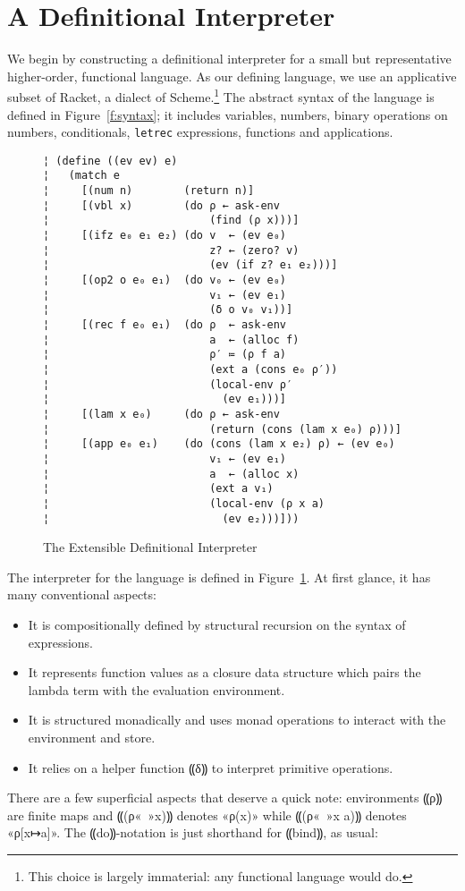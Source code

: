 \section{A Definitional Interpreter}\label{s:interp}

We begin by constructing a definitional interpreter for a small but
representative higher-order, functional language.  As our defining language, we
use an applicative subset of Racket, a dialect of Scheme.\footnote{This choice
  is largely immaterial: any functional language would do.} The abstract syntax
of the language is defined in Figure~\ref{f:syntax}; it includes variables,
numbers, binary operations on numbers, conditionals, {\tt letrec} expressions,
functions and applications.

\begin{figure} %
\begin{lstlisting}
¦ (define ((ev ev) e)
¦   (match e
¦     [(num n)        (return n)]
¦     [(vbl x)        (do ρ ← ask-env
¦                         (find (ρ x)))]    
¦     [(ifz e₀ e₁ e₂) (do v  ← (ev e₀)
¦                         z? ← (zero? v)
¦                         (ev (if z? e₁ e₂)))]
¦     [(op2 o e₀ e₁)  (do v₀ ← (ev e₀)
¦                         v₁ ← (ev e₁)
¦                         (δ o v₀ v₁))]
¦     [(rec f e₀ e₁)  (do ρ  ← ask-env
¦                         a  ← (alloc f)
¦                         ρ′ ≔ (ρ f a)
¦                         (ext a (cons e₀ ρ′))
¦                         (local-env ρ′
¦                           (ev e₁)))]
¦     [(lam x e₀)     (do ρ ← ask-env
¦                         (return (cons (lam x e₀) ρ)))]
¦     [(app e₀ e₁)    (do (cons (lam x e₂) ρ) ← (ev e₀)
¦                         v₁ ← (ev e₁)
¦                         a  ← (alloc x)         
¦                         (ext a v₁)
¦                         (local-env (ρ x a) 
¦                           (ev e₂)))]))
\end{lstlisting}
\caption{The Extensible Definitional Interpreter}
\label{f:interpreter}
\end{figure} %

The interpreter for the language is defined in Figure~\ref{f:interpreter}. At
first glance, it has many conventional aspects:
\begin{itemize}
\item It is compositionally defined by structural recursion on the syntax of
expressions.
\item It represents function values as a closure data structure which pairs the
lambda term with the evaluation environment.
\item It is structured monadically and uses monad operations to interact with
the environment and store.
\item It relies on a helper function ⸨δ⸩ to interpret primitive operations.
\end{itemize}
There are a few superficial aspects that deserve a quick note:
environments ⸨ρ⸩ are finite maps and ⸨(ρ«\ »x)⸩ denotes
«ρ(x)» while ⸨(ρ«\ »x a)⸩ denotes «ρ[x↦a]».  The
⸨do⸩-notation is just shorthand for ⸨bind⸩, as usual:

